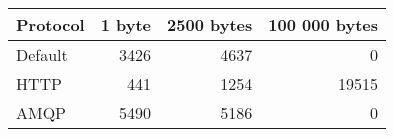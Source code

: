 \begin{tabular}{lrrr}
\hline
 Protocol   &   1 byte &   2500 bytes &   100 000 bytes \\
\hline
 Default    &     3426 &         4637 &               0 \\
 HTTP       &      441 &         1254 &           19515 \\
 AMQP       &     5490 &         5186 &               0 \\
\hline
\end{tabular}